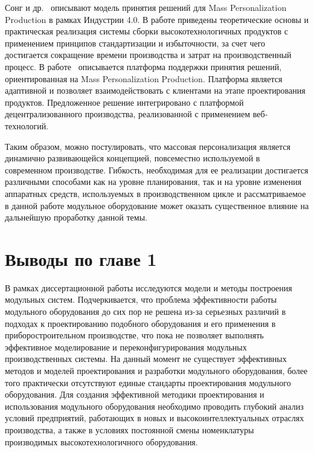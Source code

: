 Сонг и др.~\cite{song2020product} описывают модель принятия решений для Mass Personalization Production в рамках Индустрии 4.0. В работе приведены теоретические основы и практическая реализация системы сборки высокотехнологичных продуктов с применением принципов стандартизации и избыточности, за счет чего достигается сокращение времени производства и затрат на производственный процесс. В работе~\cite{mourtzis2014web} описывается платформа поддержки принятия решений, ориентированная на Mass Personalization Production. Платформа является адаптивной и позволяет взаимодействовать с клиентами на этапе проектирования продуктов. Предложенное решение интегрировано с платформой децентрализованного производства, реализованной с применением веб-технологий.

Таким образом, можно постулировать, что массовая персонализация является динамично развивающейся концепцией, повсеместно используемой в современном производстве. Гибкость, необходимая для ее реализации достигается различными способами как на уровне планирования, так и на уровне изменения аппаратных средств, используемых в производственном цикле и рассматриваемое в данной работе модульное оборудование может оказать существенное влияние на дальнейшую проработку данной темы.

\section{Выводы по главе 1}

В рамках диссертационной работы исследуются модели и методы построения модульных систем. Подчеркивается, что проблема эффективности работы модульного оборудования до сих пор не решена из-за серьезных различий в подходах к проектированию подобного оборудования и его применения в приборостроительном производстве, что пока не позволяет выполнять эффективное моделирование и переконфигурирования модульных производственных системы. На данный момент не существует эффективных методов и моделей проектирования и разработки модульного оборудования, более того практически отсутствуют единые стандарты проектирования модульного оборудования. Для создания эффективной методики проектирования и использования модульного оборудования необходимо проводить глубокий анализ условий предприятий, работающих в новых и высокоинтеллектуальных отраслях производства, а также в условиях постоянной смены номенклатуры производимых высокотехнологичного оборудования.

\FloatBarrier
